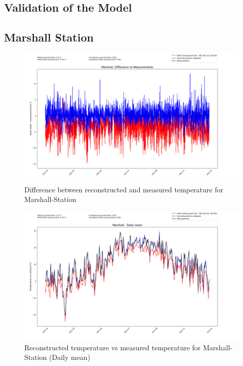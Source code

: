 

\subsection{Validation of the Model}
\subsection*{Marshall Station}

\begin{figure}
    \centering
    \includegraphics[width=\textwidth]{resources/images/charts/marshall_eval_grib_final/Marshall, Difference to Measurements.png}
    \caption{Difference between reconstructed and measured temperature for Marshall-Station}
\end{figure}

\begin{figure}
    \centering
    \includegraphics[width=\textwidth]{resources/images/charts/marshall_eval_grib_final/Marshall - Daily mean.png}
    \caption{Reconstructed temperature vs measured temperature for Marshall-Station (Daily mean)}
\end{figure}

